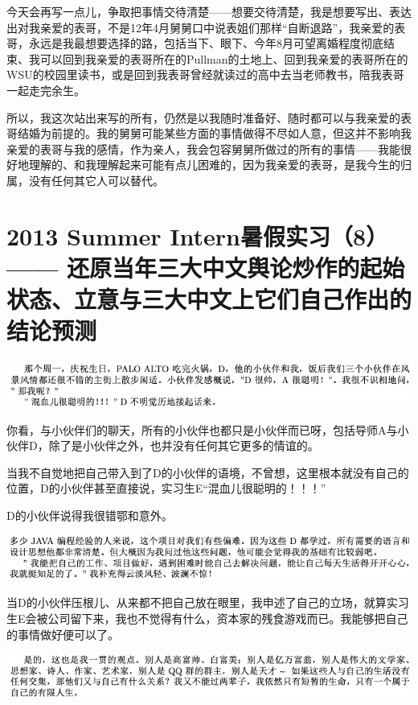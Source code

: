 \documentclass[9pt, b5paper]{article}
\begin{document}
今天会再写一点儿，争取把事情交待清楚——想要交待清楚，我是想要写出、表达出对我亲爱的表哥，不是12年4月舅舅口中说表姐们那样“自断退路”，我亲爱的表哥，永远是我最想要选择的路，包括当下、眼下、今年8月可望离婚程度彻底结束、我可以回到我亲爱的表哥所在的Pullman的土地上、回到我亲爱的表哥所在的WSU的校园里读书，或是回到我表哥曾经就读过的高中去当老师教书，陪我表哥一起走完余生。

所以，我这次站出来写的所有，仍然是以我随时准备好、随时都可以与我亲爱的表哥结婚为前提的。我的舅舅可能某些方面的事情做得不尽如人意，但这并不影响我亲爱的表哥与我的感情，作为亲人，我会包容舅舅所做过的所有的事情——我能很好地理解的、和我理解起来可能有点儿困难的，因为我亲爱的表哥，是我今生的归属，没有任何其它人可以替代。 

\section{2013 Summer Intern暑假实习（8）—— 还原当年三大中文舆论炒作的起始状态、立意与三大中文上它们自己作出的结论预测}
\label{sec:org5482f38}

\begin{center}
\includegraphics[width=.9\linewidth]{./pic/backups_plans_20210514_121334.png}
\end{center}

你看，与小伙伴们的聊天，所有的小伙伴也都只是小伙伴而已呀，包括导师A与小伙伴D，除了是小伙伴之外，也并没有任何其它更多的情谊的。 

当我不自觉地把自己带入到了D的小伙伴的语境，不曾想，这里根本就没有自己的位置，D的小伙伴甚至直接说，实习生E“混血儿很聪明的！！！”

D的小伙伴说得我很错鄂和意外。 

\begin{center}
\includegraphics[width=.9\linewidth]{./pic/backups_plans_20210514_121704.png}
\end{center}

当D的小伙伴压根儿、从来都不把自己放在眼里，我申述了自己的立场，就算实习生E会被公司留下来，我也不觉得有什么，资本家的残食游戏而已。我能够把自己的事情做好便可以了。 

\begin{center}
\includegraphics[width=.9\linewidth]{./pic/backups_plans_20210514_122038.png}
\end{center}
\end{document}

